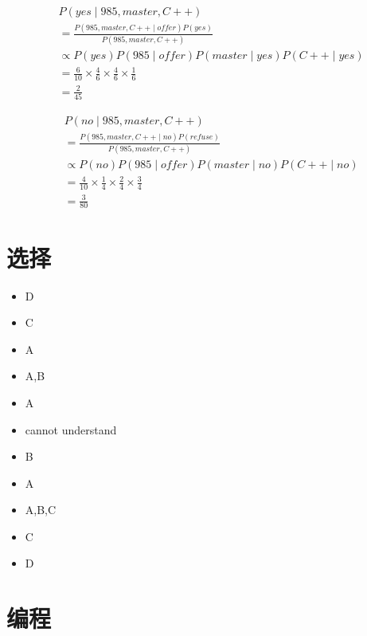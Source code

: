 \documentclass[letterpaper, 10 pt, conference]{ieeeconf}
\begin{document}
\begin{align*}
    & P(yes \mid 985,master,C++) \\
    & = \frac{P(985,master,C++ \mid offer)P(yes)}{P(985,master,C++)} \\
    & \propto P(yes)P(985 \mid offer)P(master \mid yes)P(C++ \mid yes) \\
    & = \frac{6}{10} \times \frac{4}{6} \times \frac{4}{6} \times \frac{1}{6} \\
    & = \frac{2}{45}
\end{align*}

\begin{align*}
    & P(no \mid 985,master,C++) \\
    & = \frac{P(985,master,C++ \mid no)P(refuse)}{P(985,master,C++)} \\
    & \propto P(no)P(985 \mid offer)P(master \mid no)P(C++ \mid no) \\
    & = \frac{4}{10} \times \frac{1}{4} \times \frac{2}{4} \times \frac{3}{4} \\
    & = \frac{3}{80}
\end{align*}


\section{选择}

\begin{itemize}

\item D
\item C
\item A
\item A,B
\item A
\item cannot understand 
\item B
\item A
\item A,B,C
\item C
\item D

\end{itemize}



\section{编程}
\end{document}
